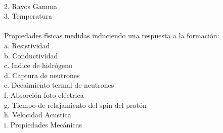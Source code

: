 \documentclass[10pt,a4paper]{report}
\begin{document}
\\ 2. Rayos Gamma
\\ 3. Temperatura
\\\\ Propiedades físicas medidas induciendo una respuesta a la formación:
\\ a. Resistividad
\\ b. Conductividad
\\ c. Indice de hidrógeno
\\ d. Captura de neutrones
\\ e. Decaimiento termal de neutrones
\\ f. Absorción foto eléctrica
\\ g. Tiempo de relajamiento del spin del protón
\\ h. Velocidad Acustica
\\ i. Propiedades Mecánicas


\end{document}

